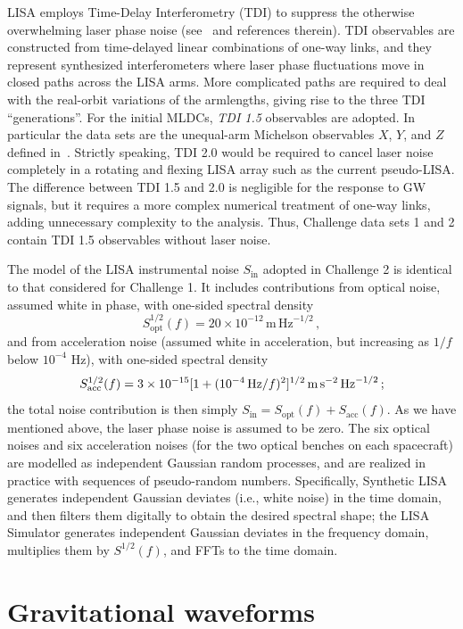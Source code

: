 \documentclass[12pt]{iopart}
\def\be{\begin{equation}}
\def\ee{\end{equation}}
\begin{document}
LISA employs Time-Delay Interferometry (TDI) to suppress the otherwise overwhelming laser phase noise (see~\cite{firstgen,modified,secondgen} and references therein). TDI observables are constructed from time-delayed linear combinations of one-way links, and they represent synthesized interferometers where laser phase fluctuations move in closed paths across the LISA arms. More complicated paths are required to deal with the real-orbit variations of the armlengths, giving rise to the three TDI ``generations''. For the initial MLDCs,  \emph{TDI 1.5} observables \cite{modified,secondgen} are adopted. In particular the data sets are the unequal-arm Michelson observables $X$, $Y$, and $Z$ defined in~\cite{secondgen}. Strictly speaking, TDI 2.0 would be required to cancel laser noise completely in a rotating and flexing LISA array such as the current pseudo-LISA. The difference between TDI 1.5 and 2.0 is negligible for the response to GW signals, but it requires a more complex  numerical treatment of one-way links, adding unnecessary complexity to the analysis. Thus, Challenge data sets 1 and 2 contain TDI 1.5 observables without laser noise.

The model of the LISA instrumental noise $S_\mathrm{in}$ adopted in Challenge 2 is identical to that considered for Challenge 1. It includes contributions from optical noise, assumed white in phase, with one-sided spectral density
\be
S_\mathrm{opt}^{1/2}(f) = 20 \times 10^{-12} \, \mathrm{m}\, \mathrm{Hz}^{-1/2}\,,
\ee
and from acceleration noise (assumed white in acceleration, but increasing as $1/f$ below $10^{-4}$ Hz), with one-sided spectral density 
\be
S_\mathrm{acc}^{1/2}(f) = 3 \times 10^{-15} [1 + (10^{-4}\,{\rm Hz}/f)^2]^{1/2}\, \mathrm{m}\, \mathrm{s}^{-2}\, \mathrm{Hz}^{-1/2}\,;
\ee
the total noise contribution is then simply $S_\mathrm{in} = S_\mathrm{opt}(f) + S_\mathrm{acc}(f)$. As we have mentioned above, the laser phase noise is assumed to be zero. The six optical noises and six acceleration noises (for the two optical benches on each spacecraft) are modelled as independent Gaussian random processes, and are realized in practice with sequences of pseudo-random numbers. Specifically, Synthetic LISA generates independent Gaussian deviates (i.e., white noise) in the time domain, and then filters them digitally to obtain the desired spectral shape; the LISA Simulator generates independent Gaussian deviates in the frequency domain, multiplies them by $S^{1/2}(f)$, and FFTs to the time domain.

\section{Gravitational waveforms}
\end{document}
